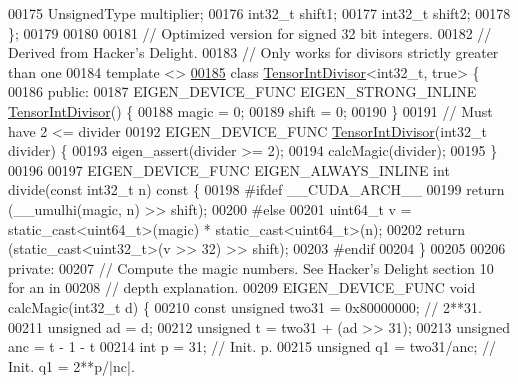 \begin{DoxyCode}
00175   UnsignedType multiplier;
00176   int32\_t shift1;
00177   int32\_t shift2;
00178 \};
00179 
00180 
00181 \textcolor{comment}{// Optimized version for signed 32 bit integers.}
00182 \textcolor{comment}{// Derived from Hacker's Delight.}
00183 \textcolor{comment}{// Only works for divisors strictly greater than one}
00184 \textcolor{keyword}{template} <>
\hyperlink{class_eigen_1_1internal_1_1_tensor_int_divisor_3_01int32__t_00_01true_01_4}{00185} \textcolor{keyword}{class }\hyperlink{struct_eigen_1_1internal_1_1_tensor_int_divisor}{TensorIntDivisor}<int32\_t, true> \{
00186  \textcolor{keyword}{public}:
00187   EIGEN\_DEVICE\_FUNC EIGEN\_STRONG\_INLINE \hyperlink{struct_eigen_1_1internal_1_1_tensor_int_divisor}{TensorIntDivisor}() \{
00188     magic = 0;
00189     shift = 0;
00190   \}
00191   \textcolor{comment}{// Must have 2 <= divider}
00192   EIGEN\_DEVICE\_FUNC \hyperlink{struct_eigen_1_1internal_1_1_tensor_int_divisor}{TensorIntDivisor}(int32\_t divider)  \{
00193     eigen\_assert(divider >= 2);
00194     calcMagic(divider);
00195   \}
00196 
00197   EIGEN\_DEVICE\_FUNC EIGEN\_ALWAYS\_INLINE \textcolor{keywordtype}{int} divide(\textcolor{keyword}{const} int32\_t n)\textcolor{keyword}{ const }\{
00198 \textcolor{preprocessor}{#ifdef \_\_CUDA\_ARCH\_\_}
00199     \textcolor{keywordflow}{return} (\_\_umulhi(magic, n) >> shift);
00200 \textcolor{preprocessor}{#else}
00201     uint64\_t v = \textcolor{keyword}{static\_cast<}uint64\_t\textcolor{keyword}{>}(magic) * static\_cast<uint64\_t>(n);
00202     \textcolor{keywordflow}{return} (static\_cast<uint32\_t>(v >> 32) >> shift);
00203 \textcolor{preprocessor}{#endif}
00204   \}
00205 
00206 \textcolor{keyword}{private}:
00207   \textcolor{comment}{// Compute the magic numbers. See Hacker's Delight section 10 for an in}
00208   \textcolor{comment}{// depth explanation.}
00209   EIGEN\_DEVICE\_FUNC \textcolor{keywordtype}{void} calcMagic(int32\_t d) \{
00210    \textcolor{keyword}{const} \textcolor{keywordtype}{unsigned} two31 = 0x80000000;     \textcolor{comment}{// 2**31.}
00211    \textcolor{keywordtype}{unsigned} ad = d;
00212    \textcolor{keywordtype}{unsigned} t = two31 + (ad >> 31);
00213    \textcolor{keywordtype}{unsigned} anc = t - 1 - t%
00214    \textcolor{keywordtype}{int} p = 31;                      \textcolor{comment}{// Init. p.}
00215    \textcolor{keywordtype}{unsigned} q1 = two31/anc;         \textcolor{comment}{// Init. q1 = 2**p/|nc|.}

\end{DoxyCode}
